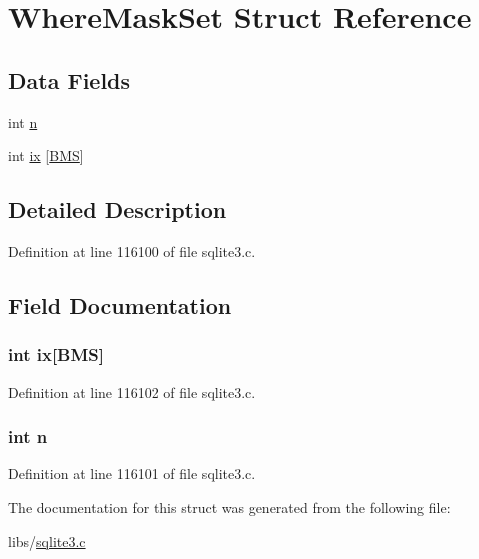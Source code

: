\hypertarget{struct_where_mask_set}{}\section{Where\+Mask\+Set Struct Reference}
\label{struct_where_mask_set}
\subsection*{Data Fields}
\begin{DoxyCompactItemize}
\item 
int \hyperlink{struct_where_mask_set_a76f11d9a0a47b94f72c2d0e77fb32240}{n}
\item 
int \hyperlink{struct_where_mask_set_a2cfb7f423317cc09c6dedf7a96cff35a}{ix} \mbox{[}\hyperlink{sqlite3_8c_a61ebf73c36e0aa88593c8fdb76891407}{B\+M\+S}\mbox{]}
\end{DoxyCompactItemize}


\subsection{Detailed Description}


Definition at line 116100 of file sqlite3.\+c.



\subsection{Field Documentation}
\hypertarget{struct_where_mask_set_a2cfb7f423317cc09c6dedf7a96cff35a}{}
\subsubsection[{ix}]{\setlength{\rightskip}{0pt plus 5cm}int ix\mbox{[}{\bf B\+M\+S}\mbox{]}}\label{struct_where_mask_set_a2cfb7f423317cc09c6dedf7a96cff35a}


Definition at line 116102 of file sqlite3.\+c.

\hypertarget{struct_where_mask_set_a76f11d9a0a47b94f72c2d0e77fb32240}{}
\subsubsection[{n}]{\setlength{\rightskip}{0pt plus 5cm}int n}\label{struct_where_mask_set_a76f11d9a0a47b94f72c2d0e77fb32240}


Definition at line 116101 of file sqlite3.\+c.



The documentation for this struct was generated from the following file\+:\begin{DoxyCompactItemize}
\item 
libs/\hyperlink{sqlite3_8c}{sqlite3.\+c}\end{DoxyCompactItemize}
